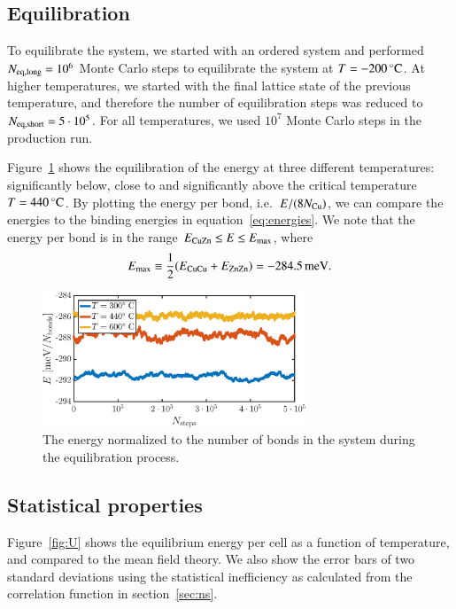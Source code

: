 \subsection*{Equilibration}
To equilibrate the system, we started with an ordered system and performed $N_{\rm eq, long} = 10^6$ Monte Carlo steps to equilibrate the system at $T = \unit[-200]{^\circ C}$. At higher temperatures, we started with the final lattice state of the previous temperature, and therefore the number of equilibration steps was reduced to $N_{\rm eq, short} = 5 \cdot 10^5$. For all temperatures, we used $10^7$ Monte Carlo steps in the production run. 

Figure~\ref{fig:T2:equil} shows the equilibration of the energy at three different temperatures: significantly below, close to and significantly above the critical temperature $T = \unit[440]{^\circ C}$. By plotting the energy per bond, i.e.\  $E/(8 N_{\rm Cu})$, we can compare the energies to the binding energies in equation~\eqref{eq:energies}. 
We note that the energy per bond is in the range $E_{\rm CuZn} \leq E \leq E_{\rm max}$, where
\begin{equation}
 E_{\rm max} \equiv \frac{1}{2}(E_{\rm CuCu} + E_{\rm ZnZn}) = \unit[-284.5]{meV}.
 \label{eq:Emax}
\end{equation}

\begin{figure}[!ht]
\begin{center}
  \includegraphics[width=0.7\textwidth]{../figures/equilibration} 
  \caption{The energy normalized to the number of bonds in the system during the equilibration process.}
  \label{fig:T2:equil}
\end{center}
\end{figure}

\subsection*{Statistical properties}
Figure~\ref{fig:U} shows the equilibrium energy per cell as a function of temperature, and compared to the mean field theory. We also show the error bars of two standard deviations using the statistical inefficiency  as calculated from the correlation function in section~\ref{sec:ns}. 


